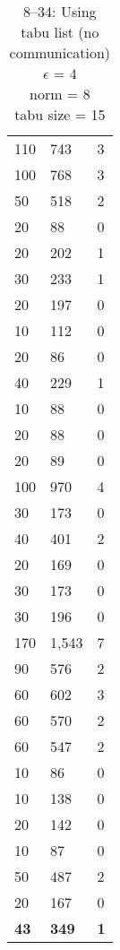 \begin{table}
\begin{minipage}[t]{0.47\textwidth}
\begin{tabular}{R{1cm}|R{1cm}|R{0.7cm}}
110 & 743 & 3\\
100 & 768 & 3\\
50 & 518 & 2\\
20 & 88 & 0\\
20 & 202 & 1\\
30 & 233 & 1\\
20 & 197 & 0\\
10 & 112 & 0\\
20 & 86 & 0\\
40 & 229 & 1\\
10 & 88 & 0\\
20 & 88 & 0\\
20 & 89 & 0\\
100 & 970 & 4\\
30 & 173 & 0\\
40 & 401 & 2\\
20 & 169 & 0\\
30 & 173 & 0\\
30 & 196 & 0\\
170 & 1,543 & 7\\
90 & 576 & 2\\
60 & 602 & 3\\
60 & 570 & 2\\
60 & 547 & 2\\
10 & 86 & 0\\
10 & 138 & 0\\
20 & 142 & 0\\
10 & 87 & 0\\
50 & 487 & 2\\
20 & 167 & 0\\
\hline
\textbf{43} & \textbf{349} & \textbf{1}\\
\hline
\end{tabular}
\caption{\gr{} 8--34: Using tabu list (no communication)\\ $\epsilon$ = 4\\norm = 8\\tabu size = 15}\label{subtab:gr_tabu}
\end{minipage}
\end{table}



